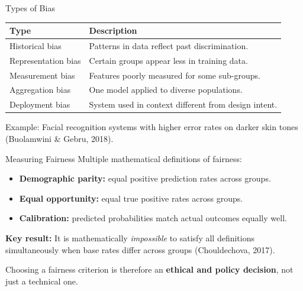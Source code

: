 \documentclass[10pt]{beamer}
\begin{document}
\begin{frame}{Types of Bias}
    \small
    \setlength{\tabcolsep}{7pt}
    \renewcommand{\arraystretch}{1.25}
    \begin{tabularx}{\textwidth}{l X}
        \toprule
        \textbf{Type} & \textbf{Description} \\
        \midrule
        Historical bias    & Patterns in data reflect past discrimination. \\
        Representation bias & Certain groups appear less in training data. \\
        Measurement bias   & Features poorly measured for some sub-groups. \\
        Aggregation bias   & One model applied to diverse populations. \\
        Deployment bias    & System used in context different from design intent. \\
        \bottomrule
    \end{tabularx}

    \vspace{0.2cm}
    Example: Facial recognition systems with higher error rates on darker skin tones (Buolamwini \& Gebru, 2018).
\end{frame}

\begin{frame}{Measuring Fairness}
    Multiple mathematical definitions of fairness:
    \begin{itemize}
        \item \textbf{Demographic parity:} equal positive prediction rates across groups.
        \item \textbf{Equal opportunity:} equal true positive rates across groups.
        \item \textbf{Calibration:} predicted probabilities match actual outcomes equally well.
    \end{itemize}

    \vspace{0.2cm}
    \textbf{Key result:} It is mathematically \emph{impossible} to satisfy all definitions simultaneously when base rates differ across groups (Chouldechova, 2017).

    \vspace{0.2cm}
    Choosing a fairness criterion is therefore an \textbf{ethical and policy decision}, not just a technical one.
\end{frame}
\end{document}
